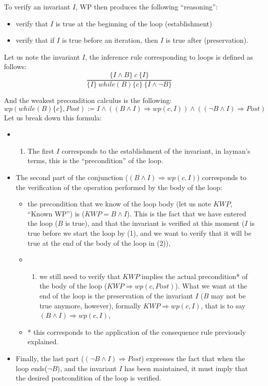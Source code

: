 To verify an invariant $I$, WP then produces the following
``reasoning'':
\begin{itemize}
\item
  verify that $I$ is true at the beginning of the loop (establishment)
\item
  verify that if $I$ is true before an iteration, then $I$ is true
  after (preservation).
\end{itemize}


Let us note the invariant $I$, the inference rule corresponding to
loops is defined as follows:
$$\dfrac{\{I \wedge B \}\ c\ \{I\}}{\{I\}\ while(B)\{c\}\ \{I \wedge \neg B\}}$$

And the weakest precondition calculus is the following:
$$wp(while (B) \{ c \}, Post) := I \wedge ((B \wedge I) \Rightarrow wp(c, I)) \wedge ((\neg B \wedge I) \Rightarrow Post)$$
Let us break down this formula:
\begin{itemize}
\item
  \begin{enumerate}
  \def\labelenumi{(\arabic{enumi})}
  \item
    The first $I$ corresponds to the establishment of the invariant,
    in layman's terms, this is the ``precondition'' of the loop.
  \end{enumerate}
\item
  The second part of the conjunction
  ($(B \wedge I) \Rightarrow wp(c, I)$) corresponds to the
  verification of the operation performed by the body of the loop:
  \begin{itemize}
  \item
    the precondition that we know of the loop body (let us note $KWP$,
    ``Known WP'') is ($KWP = B \wedge I$). This is the fact that we have
    entered the loop ($B$ is true), and that the invariant is verified
    at this moment ($I$ is true before we start the loop by (1), and
    we want to verify that it will be true at the end of the body of the
    loop in (2)),
  \item
    \begin{enumerate}
    \def\labelenumi{(\arabic{enumi})}
    \setcounter{enumi}{1}
    \item
      we still need to verify that $KWP$ implies the actual precondition*
      of the body of the loop ($KWP \Rightarrow wp(c, Post)$). What we
      want at the end of the loop is the preservation of the invariant
      $I$ ($B$ may not be true anymore, however), formally
      $KWP \Rightarrow wp(c, I)$, that is to say
      $(B \wedge I) \Rightarrow wp(c, I)$,
    \end{enumerate}
  \item
    * this corresponds to the application of the consequence rule
    previously explained.
  \end{itemize}
\item
  Finally, the last part ($(\neg B \wedge I) \Rightarrow Post$)
  expresses the fact that when the loop ends($\neg B$), and the
  invariant $I$ has been maintained, it must imply that the desired
  postcondition of the loop is verified.
\end{itemize}

